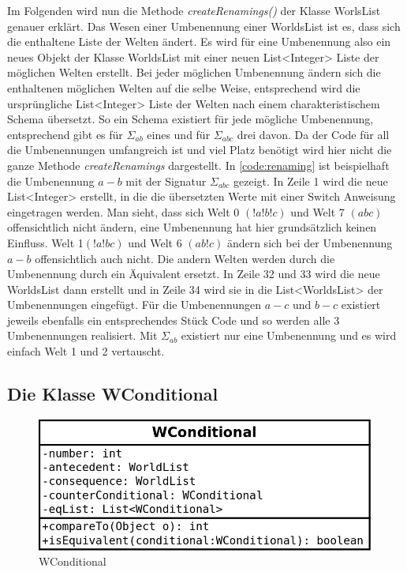 \documentclass[12pt,a4paper]{article}
\begin{document}
Im Folgenden wird nun die Methode \textit{createRenamings()} der Klasse WorlsList genauer erklärt. Das Wesen einer Umbenennung einer WorldsList ist es, dass sich die enthaltene Liste der Welten ändert. Es wird für eine Umbenennung also ein neues Objekt der Klasse WorldsList mit einer neuen List<Integer> Liste der möglichen Welten erstellt. Bei jeder möglichen Umbenennung ändern sich die enthaltenen möglichen Welten auf die selbe Weise, entsprechend wird die ursprüngliche List<Integer> Liste der Welten nach einem charakteristischem Schema \glqq übersetzt\grqq. So ein Schema existiert für jede mögliche Umbenennung, entsprechend gibt es für $\Sigma_{ab}$ eines und für $\Sigma_{abc}$ drei davon. Da der Code für all die Umbenennungen umfangreich ist und viel Platz benötigt wird hier nicht die ganze Methode \textit{createRenamings} dargestellt. In \ref{code:renaming} ist beispielhaft die Umbenennung $a-b$ mit der Signatur $\Sigma_{abc}$ gezeigt. In Zeile 1 wird die neue List<Integer> erstellt, in die die übersetzten Werte mit einer Switch Anweisung eingetragen werden. Man sieht, dass sich  Welt 0 $(!a!b!c)$ und Welt 7 $(abc)$ offensichtlich nicht ändern, eine Umbenennung hat hier grundsätzlich keinen Einfluss. Welt 1$(!a!bc)$ und Welt 6 $(ab!c)$ ändern sich bei der Umbenennung $a-b$ offensichtlich auch nicht. Die andern Welten werden durch die Umbenennung durch ein Äquivalent ersetzt. In Zeile 32 und 33 wird die neue WorldsList dann erstellt und in Zeile 34 wird sie in die List<WorldsList> der Umbenennungen eingefügt.  Für die Umbenennungen $a-c$ und $b-c$ existiert jeweils ebenfalls ein entsprechendes Stück Code und so werden alle 3 Umbenennungen realisiert. Mit $\Sigma_{ab}$ existiert nur eine Umbenennung und es wird einfach Welt 1 und 2 vertauscht.




\subsection{Die Klasse WConditional} 

\begin{figure}
\includegraphics[width=0.55\linewidth]{bilder/wconditional.png}
\caption{WConditional}
\label{pic:wconditional}
\end{figure}
\end{document}
